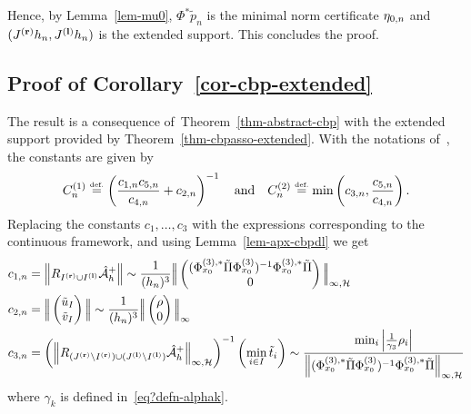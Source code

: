 Hence, by Lemma~\ref{lem-mu0}, $\Phi^*\tilde{p}_n$ is the minimal norm certificate $\eta_{0,n}$ and $({J^{\mathbf{(r)}}}{h_n},{J^{\mathbf{(l)}}}{h_n})$ is the extended support. This concludes the proof.



\subsection{Proof of Corollary~\ref{cor-cbp-extended}}
\label{prop-asympto-constant-cbp-proof}


The result is a consequence of~Theorem~\ref{thm-abstract-cbp} with the extended support provided by Theorem~\ref{thm-cbpasso-extended}. With the notations of~\cite[Appendix C.2]{2016-duval-thinlasso}, the constants are given by
\begin{align*}
  C^{(1)}_n\stackrel{\mbox{\upshape\tiny def.}}{=}\left(\frac{c_{1,n}c_{5,n}}{c_{4,n}}+c_{2,n} \right)^{-1}\quad \text{and} \quad
  C^{(2)}_n\stackrel{\mbox{\upshape\tiny def.}}{=} \min\left(c_{3,n},\frac{c_{5,n}}{c_{4,n}}\right) .
\end{align*}
Replacing the constants $c_1,\ldots, c_3$
with the expressions corresponding to the continuous framework, and using Lemma~\ref{lem-apx-cbpdl} we get
\begin{align}\label{eq-cbp-cst-asympt-1}
	c_{1,n}&= \left\lVert R_{{I^{\mathbf{(r)}}}\cup{I^{\mathbf{(l)}}}}{\hat{\mathcal{A}}_h}^+ \right\rVert  
	\sim 
	\frac{1}{({h_n})^3}\Big|\!\Big| \begin{pmatrix}
    (\Phi_{x_0}^{(3),*}\tilde{\Pi} \Phi_{x_0}^{(3)})^{-1}\Phi_{x_0}^{(3),*}\tilde{\Pi} \\
    0
  \end{pmatrix} \Big |\!\Big|_{\infty,\mathcal{H}}\\
  	\label{eq-cbp-cst-asympt-2}
  	c_{2,n}&= 
	\Big|\!\Big| \begin{pmatrix} \tilde{u}_I\\\tilde{v}_I \end{pmatrix} \Big |\!\Big|
	\sim 
	\frac{1}{({h_n})^3} 
	\Big|\!\Big| 
		\begin{pmatrix}\rho \\ 0 \end{pmatrix}
	 \Big |\!\Big|_{\infty}\\
	\label{eq-cbp-cst-asympt-3}
  	c_{3,n} &= 
  	\left(\left\lVert R_{({J^{\mathbf{(r)}}}\setminus{I^{\mathbf{(r)}}})\cup({J^{\mathbf{(l)}}}\setminus{I^{\mathbf{(l)}}})}{\hat{\mathcal{A}}_h}^+ \right\rVert_{\infty,\mathcal{H}}\right)^{-1}
	\left(\min_{i\in I}\tilde{t}_i\right)
		\sim 
		\frac{
			\min_i \left| \frac{1}{\gamma_3} \rho_i \right|  
		}{
			\left\lVert (\Phi_{x_0}^{(3),*}\tilde{\Pi} \Phi_{x_0}^{(3)})^{-1}\Phi_{x_0}^{(3),*}\tilde{\Pi} \right\rVert_{\infty,\mathcal{H}}
		}
\end{align}
where $\gamma_k$ is defined in~\eqref{eq?defn-alphak}.

